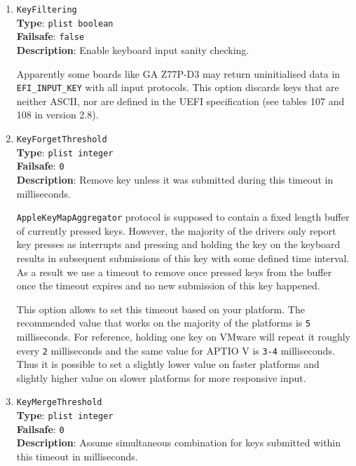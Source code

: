 \documentclass[]{article}
\begin{document}
\begin{enumerate}

\item
  \texttt{KeyFiltering}\\
  \textbf{Type}: \texttt{plist\ boolean}\\
  \textbf{Failsafe}: \texttt{false}\\
  \textbf{Description}: Enable keyboard input sanity checking.

  Apparently some boards like GA Z77P-D3 may return uninitialised data
  in \texttt{EFI\_INPUT\_KEY} with all input protocols.
  This option discards keys that are neither ASCII, nor are defined
  in the UEFI specification (see tables 107 and 108 in version 2.8).

\item
  \texttt{KeyForgetThreshold}\\
  \textbf{Type}: \texttt{plist\ integer}\\
  \textbf{Failsafe}: \texttt{0}\\
  \textbf{Description}: Remove key unless it was submitted during this timeout in milliseconds.

  \texttt{AppleKeyMapAggregator} protocol is supposed to contain a fixed length buffer
  of currently pressed keys. However, the majority of the drivers only report key
  presses as interrupts and pressing and holding the key on the keyboard results in
  subsequent submissions of this key with some defined time interval. As a result
  we use a timeout to remove once pressed keys from the buffer once the timeout
  expires and no new submission of this key happened.

  This option allows to set this timeout based on your platform. The recommended
  value that works on the majority of the platforms is \texttt{5} milliseconds.
  For reference, holding one key on VMware will repeat it roughly every \texttt{2}
  milliseconds and the same value for APTIO V is \texttt{3-4} milliseconds. Thus
  it is possible to set a slightly lower value on faster platforms
  and slightly higher value on slower platforms for more responsive input.

\item
  \texttt{KeyMergeThreshold}\\
  \textbf{Type}: \texttt{plist\ integer}\\
  \textbf{Failsafe}: \texttt{0}\\
  \textbf{Description}: Assume simultaneous combination for keys submitted within
  this timeout in milliseconds.


\end{enumerate}
\end{document}
